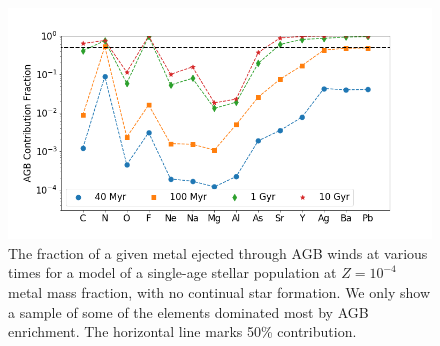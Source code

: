 \documentclass[twocolumn]{aastex61}
\begin{document}
\begin{figure}
\centering
\includegraphics[width=0.95\linewidth]{Half_AGB_Fraction_elements_s0.png}
\caption{The fraction of a given metal ejected through AGB winds at various times for a model of a single-age stellar population at $Z = 10^{-4}$ metal mass fraction, with no continual star formation. We only show a sample of some of the elements dominated most by AGB enrichment. The horizontal line marks 50\% contribution.}
\label{fig:agb evolution}
\end{figure}


\end{document}

